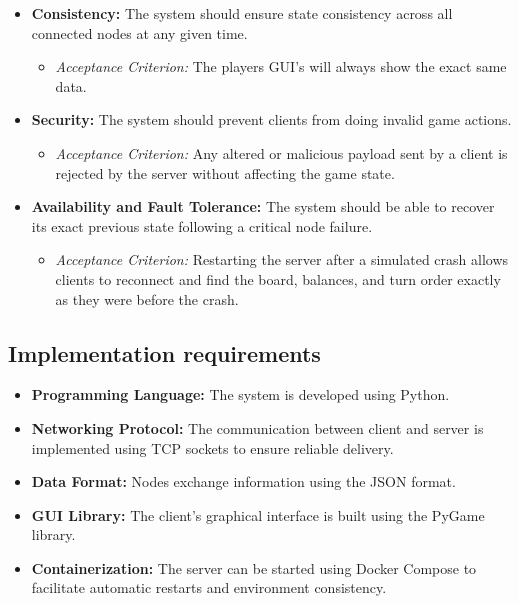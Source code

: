 \documentclass{scrartcl}
\begin{document}
\begin{itemize}
    \item \textbf{Consistency:} The system should ensure state consistency across all connected nodes at any given time.
    \begin{itemize}
        \item \textit{Acceptance Criterion:} The players GUI's will always show the exact same data.
    \end{itemize}
    \item \textbf{Security:} The system should prevent clients from doing invalid game actions.
    \begin{itemize}
        \item \textit{Acceptance Criterion:} Any altered or malicious payload sent by a client is rejected by the server without affecting the game state.
    \end{itemize}
    \item \textbf{Availability and Fault Tolerance:} The system should be able to recover its exact previous state following a critical node failure.
    \begin{itemize}
        \item \textit{Acceptance Criterion:} Restarting the server after a simulated crash allows clients to reconnect and find the board, balances, and turn order exactly as they were before the crash.
    \end{itemize}
\end{itemize}

\subsection{Implementation requirements}\label{implementation_requirements}

\begin{itemize}
    \item \textbf{Programming Language:} The system is developed using Python.
    \item \textbf{Networking Protocol:} The communication between client and server is
                                              implemented using TCP sockets to ensure reliable delivery.
    \item \textbf{Data Format:} Nodes exchange information using the JSON format.
    \item \textbf{GUI Library:} The client's graphical interface is built using the PyGame library.
    \item \textbf{Containerization:} The server can be started using Docker Compose to facilitate
                                            automatic restarts and environment consistency.
\end{itemize}
\end{document}
